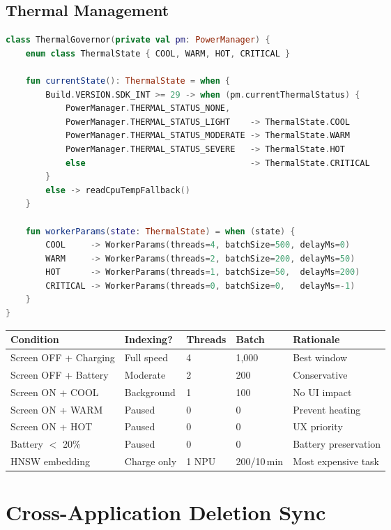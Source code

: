 \section{Thermal Management}

\begin{lstlisting}[language=Kotlin, caption=ThermalGovernor.kt]
class ThermalGovernor(private val pm: PowerManager) {
    enum class ThermalState { COOL, WARM, HOT, CRITICAL }

    fun currentState(): ThermalState = when {
        Build.VERSION.SDK_INT >= 29 -> when (pm.currentThermalStatus) {
            PowerManager.THERMAL_STATUS_NONE,
            PowerManager.THERMAL_STATUS_LIGHT    -> ThermalState.COOL
            PowerManager.THERMAL_STATUS_MODERATE -> ThermalState.WARM
            PowerManager.THERMAL_STATUS_SEVERE   -> ThermalState.HOT
            else                                 -> ThermalState.CRITICAL
        }
        else -> readCpuTempFallback()
    }

    fun workerParams(state: ThermalState) = when (state) {
        COOL     -> WorkerParams(threads=4, batchSize=500, delayMs=0)
        WARM     -> WorkerParams(threads=2, batchSize=200, delayMs=50)
        HOT      -> WorkerParams(threads=1, batchSize=50,  delayMs=200)
        CRITICAL -> WorkerParams(threads=0, batchSize=0,   delayMs=-1)
    }
}
\end{lstlisting}

\begin{longtable}{@{}p{48mm}p{24mm}p{18mm}p{16mm}p{30mm}@{}}
\toprule
\textbf{Condition} & \textbf{Indexing?} & \textbf{Threads} & \textbf{Batch} & \textbf{Rationale} \\
\midrule
Screen OFF + Charging & Full speed & 4 & 1,000 & Best window \\
Screen OFF + Battery & Moderate & 2 & 200 & Conservative \\
Screen ON + COOL & Background & 1 & 100 & No UI impact \\
Screen ON + WARM & Paused & 0 & 0 & Prevent heating \\
Screen ON + HOT & Paused & 0 & 0 & UX priority \\
Battery $<$ 20\% & Paused & 0 & 0 & Battery preservation \\
HNSW embedding & Charge only & 1 NPU & 200/10\,min & Most expensive task \\
\bottomrule
\end{longtable}

\chapter{Cross-Application Deletion Sync}

